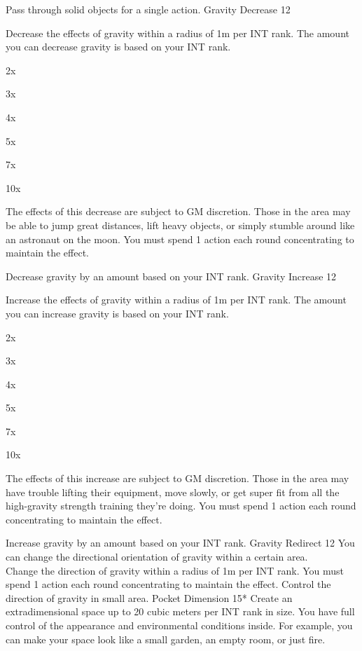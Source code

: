 \begin{path}
{Pass through solid objects for a single action.}
\skilldescription
{Gravity Decrease}
{12}
{Decrease the effects of gravity within a radius of 1m per INT rank. The amount you can decrease gravity is based on your INT rank.
\begin{wldescription}
\item [E rank:]  2x
\item [D rank:]  3x
\item [C rank:]  4x
\item [B rank:]  5x
\item [A rank:]  7x
\item [EX rank:]  10x
\end{wldescription}
The effects of this decrease are subject to GM discretion. Those in the area may be able to jump great distances, lift heavy objects, or simply stumble around like an astronaut on the moon. You must spend 1 action each round concentrating to maintain the effect.}
{Decrease gravity by an amount based on your INT rank.}
\skilldescription
{Gravity Increase}
{12}
{Increase the effects of gravity within a radius of 1m per INT rank. The amount you can increase gravity is based on your INT rank.
\begin{wldescription}
\item [E rank:]  2x
\item [D rank:]  3x
\item [C rank:]  4x
\item [B rank:]  5x
\item [A rank:]  7x
\item [EX rank:]  10x
\end{wldescription}
The effects of this increase are subject to GM discretion. Those in the area may have trouble lifting their equipment, move slowly, or get super fit from all the high-gravity strength training they're doing. You must spend 1 action each round concentrating to maintain the effect.}
{Increase gravity by an amount based on your INT rank.}
\skilldescription
{Gravity Redirect}
{12}
{You can change the directional orientation of gravity within a certain area.
\\Change the direction of gravity within a radius of 1m per INT rank. You must spend 1 action each round concentrating to maintain the effect.}
{Control the direction of gravity in small area.}
\skilldescription
{Pocket Dimension}
{15*}
{Create an extradimensional space up to 20 cubic meters per INT rank in size. You have full control of the appearance and environmental conditions inside. For example, you can make your space look like a small garden, an empty room, or just fire.
}
\end{path}
